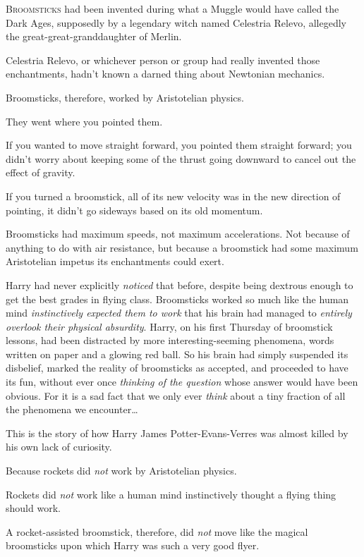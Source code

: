 
\lettrine{B}{roomsticks} had been invented during what a Muggle would have called the Dark Ages, supposedly by a legendary witch named Celestria Relevo, allegedly the great-great-granddaughter of Merlin.

Celestria Relevo, or whichever person or group had really invented those enchantments, hadn't known a darned thing about Newtonian mechanics.

Broomsticks, therefore, worked by Aristotelian physics.

They went where you pointed them.

If you wanted to move straight forward, you pointed them straight forward; you didn't worry about keeping some of the thrust going downward to cancel out the effect of gravity.

If you turned a broomstick, all of its new velocity was in the new direction of pointing, it didn't go sideways based on its old momentum.

Broomsticks had maximum speeds, not maximum accelerations. Not because of anything to do with air resistance, but because a broomstick had some maximum Aristotelian impetus its enchantments could exert.

Harry had never explicitly \emph{noticed} that before, despite being dextrous enough to get the best grades in flying class. Broomsticks worked so much like the human mind \emph{instinctively expected them to work} that his brain had managed to \emph{entirely overlook their physical absurdity}. Harry, on his first Thursday of broomstick lessons, had been distracted by more interesting-seeming phenomena, words written on paper and a glowing red ball. So his brain had simply suspended its disbelief, marked the reality of broomsticks as accepted, and proceeded to have its fun, without ever once \emph{thinking of the question} whose answer would have been obvious. For it is a sad fact that we only ever \emph{think} about a tiny fraction of all the phenomena we encounter…

This is the story of how Harry James Potter-Evans-Verres was almost killed by his own lack of curiosity.

Because rockets did \emph{not} work by Aristotelian physics.

Rockets did \emph{not} work like a human mind instinctively thought a flying thing should work.

A rocket-assisted broomstick, therefore, did \emph{not} move like the magical broomsticks upon which Harry was such a very good flyer.

